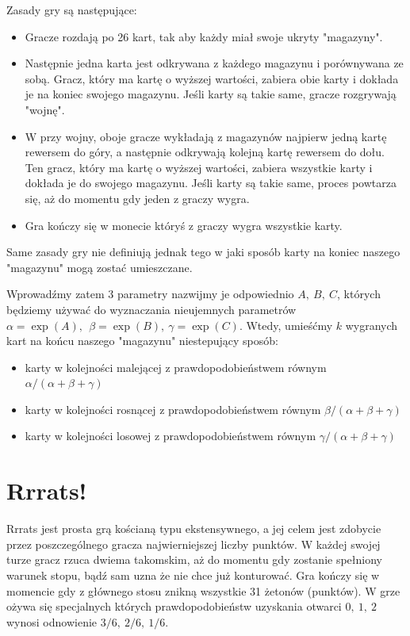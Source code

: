 \documentclass[inzynierska]{pwr_wmat_praca_dyplomowa}
\theoremstyle{plain}
\numberwithin{theorem}{chapter}
\theoremstyle{definition}
\numberwithin{theorem}{chapter}
\begin{document}
	Zasady gry są następujące:
	\begin{itemize}
		\item 	Gracze rozdają po 26 kart, tak aby każdy miał swoje ukryty "magazyny".
		
		\item Następnie jedna karta jest odkrywana z każdego magazynu i porównywana ze sobą. Gracz, który ma kartę o wyższej wartości, zabiera obie karty i dokłada je na koniec swojego magazynu. Jeśli karty są takie same, gracze rozgrywają "wojnę".
		
		\item W przy wojny, oboje gracze wykładają z magazynów najpierw jedną kartę rewersem do góry, a następnie odkrywają kolejną kartę rewersem do dołu. Ten gracz, który ma kartę o wyższej wartości, zabiera wszystkie karty i dokłada je do swojego magazynu. Jeśli karty są takie same, proces powtarza się, aż do momentu gdy jeden z graczy wygra.
		
		\item Gra kończy się w monecie któryś z graczy wygra wszystkie karty.
	\end{itemize}
	Same zasady gry nie definiują jednak tego w jaki sposób karty na koniec naszego "magazynu" mogą zostać umieszczane.
	
	Wprowadźmy zatem 3 parametry nazwijmy je odpowiednio $A,\:B,\:C$, których będziemy używać do wyznaczania nieujemnych parametrów $\alpha = \exp(A),\: \
	\beta= \exp(B),\: \gamma= \exp(C)$. Wtedy, umieśćmy $k$ wygranych kart na końcu naszego "magazynu" niestepujący sposób:
	\begin{itemize}
		\item karty w kolejności malejącej z prawdopodobieństwem równym $\alpha/(\alpha+\beta+\gamma)$ 
		
		\item karty w kolejności rosnącej z prawdopodobieństwem równym $\beta/(\alpha+\beta+\gamma)$ 
		
		\item karty w kolejności losowej z prawdopodobieństwem równym $\gamma/(\alpha+\beta+\gamma)$ 
	\end{itemize}
	
	\section{Rrrats!}
	Rrrats jest prosta grą kościaną typu ekstensywnego, a jej celem jest zdobycie przez poszczególnego gracza najwierniejszej liczby punktów. W każdej swojej turze gracz rzuca dwiema takomskim, aż do momentu gdy zostanie spełniony warunek stopu, bądź sam uzna że nie chce już konturować. Gra kończy się w momencie gdy z głównego stosu znikną wszystkie 31 żetonów (punktów). W grze ożywa się specjalnych których prawdopodobieństw uzyskania otwarci $0,\:1,\:2$ wynosi odnowienie $3/6,\:2/6,\:1/6$.
	
\end{document}
